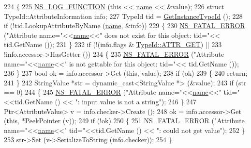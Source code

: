 \begin{DoxyCode}
224 \{
225   \hyperlink{log-macros-disabled_8h_a90b90d5bad1f39cb1b64923ea94c0761}{NS\_LOG\_FUNCTION} (\textcolor{keyword}{this} << \hyperlink{generate__test__data__lte__spectrum__model_8m_ab74e6bf80237ddc4109968cedc58c151}{name} << &value);
226   \textcolor{keyword}{struct }TypeId::AttributeInformation info;
227   TypeId tid = \hyperlink{classns3_1_1ObjectBase_abe5b43a6f5b99a92a4c3122db31f06fb}{GetInstanceTypeId} ();
228   \textcolor{keywordflow}{if} (!tid.LookupAttributeByName (\hyperlink{generate__test__data__lte__spectrum__model_8m_ab74e6bf80237ddc4109968cedc58c151}{name}, &info))
229     \{
230       \hyperlink{group__fatal_ga5131d5e3f75d7d4cbfd706ac456fdc85}{NS\_FATAL\_ERROR} (\textcolor{stringliteral}{"Attribute name="}<<\hyperlink{generate__test__data__lte__spectrum__model_8m_ab74e6bf80237ddc4109968cedc58c151}{name}<<\textcolor{stringliteral}{" does not exist for this object: tid="}<<
      tid.GetName ());
231     \}
232   \textcolor{keywordflow}{if} (!(info.flags & \hyperlink{classns3_1_1TypeId_a3ab7b43b95f96391c514d609ca60e542a3dd4b476c9b257285c177d6c414b5fd0}{TypeId::ATTR\_GET}) || 
233       !info.accessor->HasGetter ())
234     \{
235       \hyperlink{group__fatal_ga5131d5e3f75d7d4cbfd706ac456fdc85}{NS\_FATAL\_ERROR} (\textcolor{stringliteral}{"Attribute name="}<<\hyperlink{generate__test__data__lte__spectrum__model_8m_ab74e6bf80237ddc4109968cedc58c151}{name}<<\textcolor{stringliteral}{" is not gettable for this object: tid="}<<
      tid.GetName ());
236     \}
237   \textcolor{keywordtype}{bool} ok = info.accessor->Get (\textcolor{keyword}{this}, value);
238   \textcolor{keywordflow}{if} (ok)
239     \{
240       \textcolor{keywordflow}{return};
241     \}
242   StringValue *str = \textcolor{keyword}{dynamic\_cast<}StringValue *\textcolor{keyword}{>} (&value);
243   \textcolor{keywordflow}{if} (str == 0)
244     \{
245       \hyperlink{group__fatal_ga5131d5e3f75d7d4cbfd706ac456fdc85}{NS\_FATAL\_ERROR} (\textcolor{stringliteral}{"Attribute name="}<<\hyperlink{generate__test__data__lte__spectrum__model_8m_ab74e6bf80237ddc4109968cedc58c151}{name}<<\textcolor{stringliteral}{" tid="}<<tid.GetName () << \textcolor{stringliteral}{": input value
       is not a string"});
246     \}
247   Ptr<AttributeValue> v = info.checker->Create ();
248   ok = info.accessor->Get (\textcolor{keyword}{this}, *\hyperlink{namespacens3_af2a7557fe9afdd98d8f6f8f6e412cf5a}{PeekPointer} (v));
249   \textcolor{keywordflow}{if} (!ok)
250     \{
251       \hyperlink{group__fatal_ga5131d5e3f75d7d4cbfd706ac456fdc85}{NS\_FATAL\_ERROR} (\textcolor{stringliteral}{"Attribute name="}<<\hyperlink{generate__test__data__lte__spectrum__model_8m_ab74e6bf80237ddc4109968cedc58c151}{name}<<\textcolor{stringliteral}{" tid="}<<tid.GetName () << \textcolor{stringliteral}{": could not
       get value"});
252     \}
253   str->Set (v->SerializeToString (info.checker));
254 \}
\end{DoxyCode}


